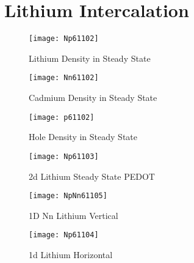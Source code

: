 
\chapter{Lithium Intercalation} %



\begin{landscape}
\begin{figure}[!htp]
\centering
\texttt{[image: Np61102]}
\caption{Lithium Density in Steady State} 
\label{Np61102}
\end{figure}
\end{landscape}
 

\begin{landscape}
\begin{figure}[!htp]
\centering
\texttt{[image: Nn61102]}
\caption{Cadmium Density in Steady State} 
\end{figure}
\end{landscape}


\begin{landscape}
\begin{figure}[!htp]
\centering
\texttt{[image: p61102]}
\caption{Hole Density in Steady State} 
\end{figure}
\end{landscape}

\begin{landscape}
\begin{figure}[!htp]
\centering
\texttt{[image: Np61103]}
\caption{2d Lithium Steady State PEDOT} 
\end{figure}
\end{landscape}

\begin{landscape}
\begin{figure}[!htp]
\centering
\texttt{[image: NpNn61105]}
\caption{1D Nn Lithium Vertical} 
\end{figure}
\end{landscape}

\begin{landscape}
\begin{figure}[!htp]
\centering
\texttt{[image: Np61104]}
\caption{1d Lithium Horizontal} 
\end{figure}
\end{landscape}

